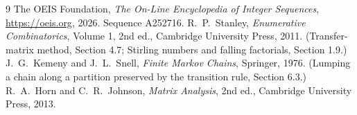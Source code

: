 \documentclass[11pt,a4paper]{article}
\theoremstyle{plain}
\theoremstyle{definition}
\begin{document}
\begin{thebibliography}{9}
 The OEIS Foundation, \emph{The On-Line Encyclopedia of Integer
Sequences}, \url{https://oeis.org}, 2026. Sequence A252716.
 R.~P.~Stanley, \emph{Enumerative Combinatorics}, Volume 1, 2nd ed.,
Cambridge University Press, 2011. (Transfer-matrix method, Section 4.7; Stirling numbers and
falling factorials, Section 1.9.)
 J.~G.~Kemeny and J.~L.~Snell, \emph{Finite Markov Chains}, Springer,
1976. (Lumping a chain along a partition preserved by the transition rule, Section 6.3.)
 R.~A.~Horn and C.~R.~Johnson, \emph{Matrix Analysis}, 2nd ed., Cambridge
University Press, 2013.
\end{thebibliography}
\end{document}
